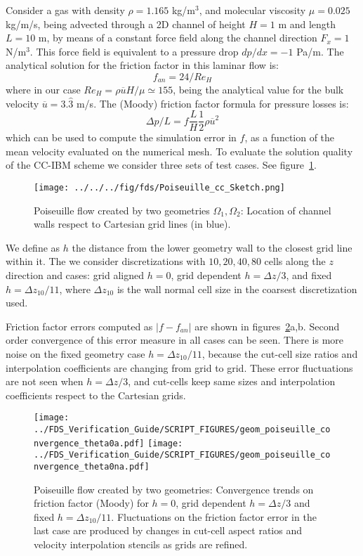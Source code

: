 \documentclass[12pt]{article}
\begin{document}
Consider a gas with density $\rho=1.165$ kg/m$^3$, and molecular viscosity $\mu=0.025$ kg/m/s, being advected through a 2D channel of height $H=1$ m and length $L=10$ m, by means of a constant force field along the channel direction $F_x=1$ N/m$^3$. This force field is equivalent to a pressure drop $dp/dx=-1$ Pa/m. The analytical solution for the friction factor in this laminar flow is:
%
\begin{equation}
   f_{an} = 24/Re_H
\end{equation}
%
where in our case $Re_H= \rho \overline{u} H/ \mu \simeq 155$, being the analytical value for the bulk velocity $\overline{u}=3.\hat{3}$ m/s. The (Moody) friction factor formula for pressure losses is:
%
\begin{equation}
   \Delta p / L = f \frac{L}{H}  \frac{1}{2} \rho \overline{u}^2
\end{equation}
%
which can be used to compute the simulation error in $f$, as a function of the mean velocity evaluated on the numerical mesh. To evaluate the solution quality of the CC-IBM scheme we consider three sets of test cases. See figure~\ref{Fig:PoiseSketch}.
%
\begin{figure}[h]
      \centering
      \texttt{[image: ../../../fig/fds/Poiseuille\_cc\_Sketch.png]}
      \caption{Poiseuille flow created by two geometries $\Omega_1, \Omega_2$: Location of channel walls respect to Cartesian grid lines (in blue).}
	\label{Fig:PoiseSketch}
\end{figure}
%
We define as $h$ the distance from the lower geometry wall to the closest grid line within it. The we consider discretizations with ${10,20,40,80}$ cells along the $z$ direction and cases: grid aligned $h=0$, grid dependent $h=\Delta z /3$, and fixed $h=\Delta z_{10}/11$, where $\Delta z_{10}$ is the wall normal cell size in the coarsest discretization used.

Friction factor errors computed as $|f-f_{an}|$ are shown in figures~\ref{Fig:PoiseConvg}a,b. Second order convergence of this error measure in all cases can be seen.
There is more noise on the fixed geometry case $h=\Delta z_{10}/11$, because the cut-cell size ratios and interpolation coefficients are changing from grid to grid. These error fluctuations are not seen when $h=\Delta z /3$, and cut-cells keep same sizes and interpolation coefficients respect to the Cartesian grids.
%
\begin{figure}[h]
      \centering
      \texttt{[image: ../FDS\_Verification\_Guide/SCRIPT\_FIGURES/geom\_poiseuille\_convergence\_theta0a.pdf]}
      \texttt{[image: ../FDS\_Verification\_Guide/SCRIPT\_FIGURES/geom\_poiseuille\_convergence\_theta0na.pdf]}
      \caption{Poiseuille flow created by two geometries: Convergence trends on friction factor (Moody) for $h=0$, grid dependent $h=\Delta z/3$ and fixed $h=\Delta z_{10}/11$. Fluctuations on the friction factor error in the last case are produced by changes in cut-cell aspect ratios and velocity interpolation stencils as grids are refined.}
      \label{Fig:PoiseConvg}
\end{figure}
%
\end{document}
